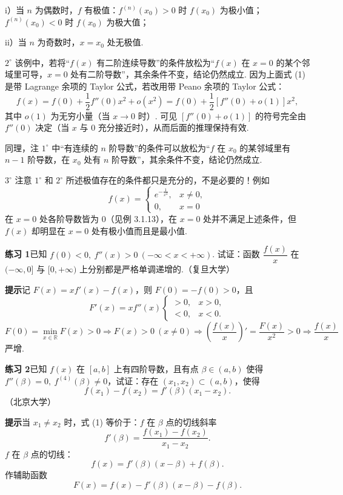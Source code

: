 \documentclass[UTF8, 12pt, fontset=fandol, oneside]{ctexart}
\begin{document}
i）当 $n$ 为偶数时，$f$ 有极值：$f^{(n)}(x_0)>0$ 时 $f(x_0)$ 为极小值；$f^{(n)}(x_0)<0$ 时 $f(x_0)$ 为极大值；

ii）当 $n$ 为奇数时，$x=x_0$ 处无极值.

$2^\circ$ 该例中，若将“$f(x)$ 有二阶连续导数”的条件放松为“$f(x)$ 在 $x=0$ 的某个邻域里可导，$x=0$ 处有二阶导数”，其余条件不变，结论仍然成立. 因为上面式 (1) 是带 Lagrange 余项的 Taylor 公式，若改用带 Peano 余项的 Taylor 公式：
\[
  f(x)=f(0)+\frac12f''(0)x^2+o(x^2)
  =f(0)+\frac12[f''(0)+o(1)]x^2,
\]
其中 $o(1)$ 为无穷小量（当 $x\to0$ 时）. 可见 $[f''(0)+o(1)]$ 的符号完全由 $f''(0)$ 决定（当 $x$ 与 0 充分接近时），从而后面的推理保持有效.

同理，注 $1^\circ$ 中“有连续的 $n$ 阶导数”的条件可以放松为“$f$ 在 $x_0$ 的某邻域里有 $n-1$ 阶导数，在 $x_0$ 处有 $n$ 阶导数”，其余条件不变，结论仍然成立.

$3^\circ$ 注意 $1^\circ$ 和 $2^\circ$ 所述极值存在的条件都只是充分的，不是必要的！例如
\[
  f(x)=
  \begin{cases}
  e^{-\frac1{x^2}}, & x\ne0,\\
  0, & x=0
  \end{cases}
\]
在 $x=0$ 处各阶导数皆为 0（见例 3.1.13），在 $x=0$ 处并不满足上述条件，但 $f(x)$ 却明显在 $x=0$ 处有极小值而且是最小值.

\noindent\textbf{练习 1}\quad 已知 $f(0)<0,\ f''(x)>0\ (-\infty<x<+\infty)$. 试证：函数 $\dfrac{f(x)}x$ 在 $(-\infty,0]$ 与 $[0,+\infty)$ 上分别都是严格单调递增的.（复旦大学）

\noindent\textbf{提示}\quad 记 $F(x)=xf'(x)-f(x)$，则 $F(0)=-f(0)>0$，且
\[
  F'(x)=xf''(x)
  \begin{cases}
  >0, & x>0,\\
  <0, & x<0.
  \end{cases}
\]
$F(0)=\min\limits_{x\in\mathbb R}F(x)>0\Rightarrow F(x)>0\ (x\ne0)\Rightarrow \left(\dfrac{f(x)}x\right)'=\dfrac{F(x)}{x^2}>0\Rightarrow \dfrac{f(x)}x$ 严增.

\noindent\textbf{练习 2}\quad 已知 $f(x)$ 在 $[a,b]$ 上有四阶导数，且有点 $\beta\in(a,b)$ 使得 $f''(\beta)=0,\ f^{(4)}(\beta)\ne0$，试证：存在 $(x_1,x_2)\subset(a,b)$，使得
\[
  f(x_1)-f(x_2)=f'(\beta)(x_1-x_2). \tag{1}
\]
（北京大学）

\noindent\textbf{提示}\quad 当 $x_1\ne x_2$ 时，式 (1) 等价于：$f$ 在 $\beta$ 点的切线斜率
\[
  f'(\beta)=\frac{f(x_1)-f(x_2)}{x_1-x_2}.
\]
$f$ 在 $\beta$ 点的切线：
\[
  f(x)=f'(\beta)(x-\beta)+f(\beta).
\]
作辅助函数
\[
  F(x)=f(x)-f'(\beta)(x-\beta)-f(\beta).
\]
\end{document}
